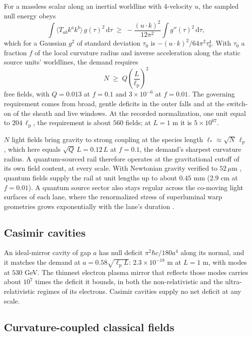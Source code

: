 \documentclass[11pt]{article}
\newcommand{\dd}{\mathrm{d}}
\newcommand{\lp}{\ell_{\mathrm p}}
\begin{document}
For a massless scalar along an inertial worldline with 4-velocity $u$, the sampled null energy obeys \cite{FewsterRoman2003}
\begin{equation}
\int\langle T_{ab}k^ak^b\rangle\,g(\tau)^2\,\dd\tau\;\ge\;-\frac{(u\cdot k)^2}{12\pi^2}\int g''(\tau)^2\,\dd\tau ,
\end{equation}
which for a Gaussian $g^2$ of standard deviation $\tau_0$ is $-(u\cdot k)^2/64\pi^2\tau_0^4$. With $\tau_0$ a fraction $f$ of the local curvature radius and inverse acceleration along the static source units' worldlines, the demand requires
\begin{equation}
N\;\ge\;Q\left(\frac{L}{\lp}\right)^2
\end{equation}
free fields, with $Q=0.013$ at $f=0.1$ and $3\times10^{-6}$ at $f=0.01$. The governing requirement comes from broad, gentle deficits in the outer falls and at the switch-on of the sheath and live windows. At the recorded normalization, one unit equal to $204\,\lp$, the requirement is about $560$ fields; at $L=1$ m it is $5\times10^{67}$.

$N$ light fields bring gravity to strong coupling at the species length $\ell_*\approx\sqrt N\,\lp$ \cite{Dvali2010}, which here equals $\sqrt Q\,L=0.12\,L$ at $f=0.1$, the demand's sharpest curvature radius. A quantum-sourced rail therefore operates at the gravitational cutoff of its own field content, at every scale. With Newtonian gravity verified to $52\,\mu$m \cite{Lee2020}, quantum fields supply the rail at unit lengths up to about $0.45$ mm ($2.9$ cm at $f=0.01$). A quantum source sector also stays regular across the co-moving light surfaces of each lane, where the renormalized stress of superluminal warp geometries grows exponentially with the lane's duration \cite{FinazziLiberatiBarcelo2009}.

\subsection{Casimir cavities}

An ideal-mirror cavity of gap $a$ has null deficit $\pi^2\hbar c/180a^4$ along its normal, and it matches the demand at $a=0.58\sqrt{\lp L}$: $2.3\times10^{-18}$ m at $L=1$ m, with modes at $530$ GeV. The thinnest electron plasma mirror that reflects those modes carries about $10^{7}$ times the deficit it bounds, in both the non-relativistic and the ultra-relativistic regimes of its electrons. Casimir cavities supply no net deficit at any scale.

\subsection{Curvature-coupled classical fields}
\end{document}
